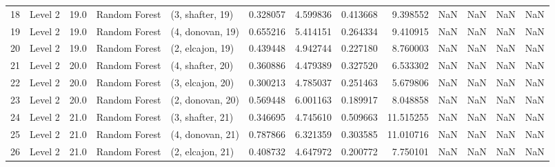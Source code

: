 \begin{tabular}{llrllrrrrrrrr}
18 &   Level 2 &   19.0 &  Random Forest &  (3, shafter, 19) &   0.328057 &   4.599836 &  0.413668 &   9.398552 &                  NaN &                    NaN &                 NaN &                   NaN \\
19 &   Level 2 &   19.0 &  Random Forest &  (4, donovan, 19) &   0.655216 &   5.414151 &  0.264334 &   9.410915 &                  NaN &                    NaN &                 NaN &                   NaN \\
20 &   Level 2 &   19.0 &  Random Forest &  (2, elcajon, 19) &   0.439448 &   4.942744 &  0.227180 &   8.760003 &                  NaN &                    NaN &                 NaN &                   NaN \\
21 &   Level 2 &   20.0 &  Random Forest &  (4, shafter, 20) &   0.360886 &   4.479389 &  0.327520 &   6.533302 &                  NaN &                    NaN &                 NaN &                   NaN \\
22 &   Level 2 &   20.0 &  Random Forest &  (3, elcajon, 20) &   0.300213 &   4.785037 &  0.251463 &   5.679806 &                  NaN &                    NaN &                 NaN &                   NaN \\
23 &   Level 2 &   20.0 &  Random Forest &  (2, donovan, 20) &   0.569448 &   6.001163 &  0.189917 &   8.048858 &                  NaN &                    NaN &                 NaN &                   NaN \\
24 &   Level 2 &   21.0 &  Random Forest &  (3, shafter, 21) &   0.346695 &   4.745610 &  0.509663 &  11.515255 &                  NaN &                    NaN &                 NaN &                   NaN \\
25 &   Level 2 &   21.0 &  Random Forest &  (4, donovan, 21) &   0.787866 &   6.321359 &  0.303585 &  11.010716 &                  NaN &                    NaN &                 NaN &                   NaN \\
26 &   Level 2 &   21.0 &  Random Forest &  (2, elcajon, 21) &   0.408732 &   4.647972 &  0.200772 &   7.750101 &                  NaN &                    NaN &                 NaN &                   NaN \\
\bottomrule
\end{tabular}
